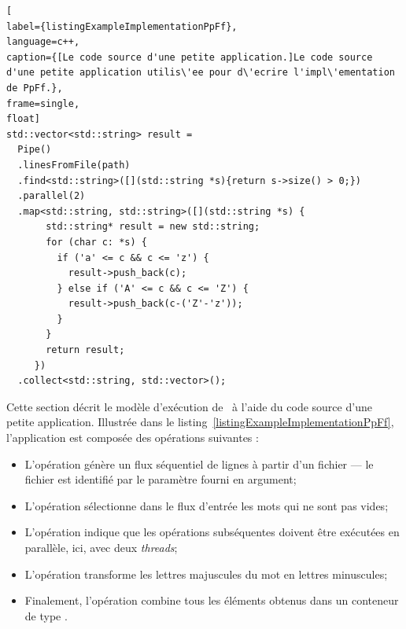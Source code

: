 \begin{lstlisting}[
label={listingExampleImplementationPpFf},
language=c++,
caption={[Le code source d'une petite application.]Le code source d'une petite application utilis\'ee pour d\'ecrire l'impl\'ementation de PpFf.},
frame=single,
float]
std::vector<std::string> result = 
  Pipe()
  .linesFromFile(path) 
  .find<std::string>([](std::string *s){return s->size() > 0;})
  .parallel(2)
  .map<std::string, std::string>([](std::string *s) {
	   std::string* result = new std::string;
       for (char c: *s) {
         if ('a' <= c && c <= 'z') {
           result->push_back(c);
         } else if ('A' <= c && c <= 'Z') {
           result->push_back(c-('Z'-'z'));
         }
       }
   	   return result;
     })
  .collect<std::string, std::vector>();
\end{lstlisting}



Cette section d\'ecrit le mod\`ele d'ex\'ecution de \ppff\ \`a l'aide du code source d'une petite application. Illustr\'ee dans le listing~\ref{listingExampleImplementationPpFf}, l'application est compos\'ee des op\'erations suivantes :
\begin{itemize}
	\item L'opération  g\'en\`ere un flux séquentiel de lignes à partir d'un fichier --- le fichier est identifi\'e par le paramètre  fourni en argument;

	\item L'op\'eration  s\'electionne dans le flux d'entr\'ee les mots qui ne sont pas vides;

	\item L'op\'eration  indique que les op\'erations subs\'equentes doivent \^etre ex\'ecut\'ees en parall\`ele, ici, avec deux \emph{threads};
	
	\item L'op\'eration  transforme les lettres majuscules du mot en lettres minuscules;
	
	\item Finalement, l'op\'eration  combine tous les \'el\'ements obtenus dans un conteneur de type .
\end{itemize}

